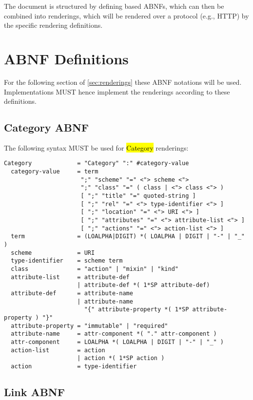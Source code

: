 \documentclass[10pt,a4paper]{article}
\begin{document}
The document is structured by defining based ABNFs, which can then be combined into renderings, which will be rendered over a protocol (e.g., HTTP) by the specific rendering definitions.

\section{ABNF Definitions}

For the following section of \ref{sec:renderings} these ABNF notations will be used. Implementations MUST hence implement the renderings according to these definitions.

\subsection{Category ABNF}

The following syntax MUST be used for \hl{Category} renderings:

\begin{verbatim}
Category             = "Category" ":" #category-value
  category-value     = term
                      ";" "scheme" "=" <"> scheme <">
                      ";" "class" "=" ( class | <"> class <"> )
                      [ ";" "title" "=" quoted-string ]
                      [ ";" "rel" "=" <"> type-identifier <"> ]
                      [ ";" "location" "=" <"> URI <"> ]
                      [ ";" "attributes" "=" <"> attribute-list <"> ]
                      [ ";" "actions" "=" <"> action-list <"> ]
  term               = (LOALPHA|DIGIT) *( LOALPHA | DIGIT | "-" | "_" )
  scheme             = URI
  type-identifier    = scheme term
  class              = "action" | "mixin" | "kind"
  attribute-list     = attribute-def
                     | attribute-def *( 1*SP attribute-def)
  attribute-def      = attribute-name
                     | attribute-name
                       "{" attribute-property *( 1*SP attribute-property ) "}"
  attribute-property = "immutable" | "required"
  attribute-name     = attr-component *( "." attr-component )
  attr-component     = LOALPHA *( LOALPHA | DIGIT | "-" | "_" )
  action-list        = action
                     | action *( 1*SP action )
  action             = type-identifier
\end{verbatim}

\subsection{Link ABNF}
\end{document}
